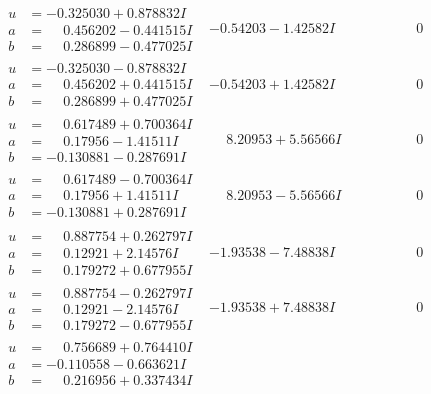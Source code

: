 \documentclass[1p]{elsarticle_modified}
\theoremstyle{definition}
\begin{document}
$$\begin{array}{c|c|c}
\begin{aligned}
u &= -0.325030 + 0.878832 I \\
a &= \phantom{-}0.456202 - 0.441515 I \\
b &= \phantom{-}0.286899 - 0.477025 I\end{aligned}
 & -0.54203 - 1.42582 I & \phantom{-0.000000 } 0 \\ \hline\begin{aligned}
u &= -0.325030 - 0.878832 I \\
a &= \phantom{-}0.456202 + 0.441515 I \\
b &= \phantom{-}0.286899 + 0.477025 I\end{aligned}
 & -0.54203 + 1.42582 I & \phantom{-0.000000 } 0 \\ \hline\begin{aligned}
u &= \phantom{-}0.617489 + 0.700364 I \\
a &= \phantom{-}0.17956 - 1.41511 I \\
b &= -0.130881 - 0.287691 I\end{aligned}
 & \phantom{-}8.20953 + 5.56566 I & \phantom{-0.000000 } 0 \\ \hline\begin{aligned}
u &= \phantom{-}0.617489 - 0.700364 I \\
a &= \phantom{-}0.17956 + 1.41511 I \\
b &= -0.130881 + 0.287691 I\end{aligned}
 & \phantom{-}8.20953 - 5.56566 I & \phantom{-0.000000 } 0 \\ \hline\begin{aligned}
u &= \phantom{-}0.887754 + 0.262797 I \\
a &= \phantom{-}0.12921 + 2.14576 I \\
b &= \phantom{-}0.179272 + 0.677955 I\end{aligned}
 & -1.93538 - 7.48838 I & \phantom{-0.000000 } 0 \\ \hline\begin{aligned}
u &= \phantom{-}0.887754 - 0.262797 I \\
a &= \phantom{-}0.12921 - 2.14576 I \\
b &= \phantom{-}0.179272 - 0.677955 I\end{aligned}
 & -1.93538 + 7.48838 I & \phantom{-0.000000 } 0 \\ \hline\begin{aligned}
u &= \phantom{-}0.756689 + 0.764410 I \\
a &= -0.110558 - 0.663621 I \\
b &= \phantom{-}0.216956 + 0.337434 I\end{aligned}

\end{array}$$
\end{document}
